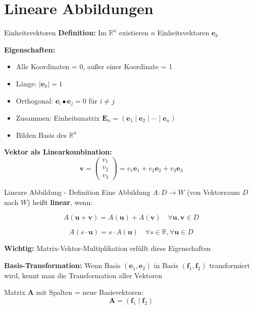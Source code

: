 \documentclass[a4paper, fontsize=7pt]{scrartcl}
\def\R{\mathbb{R}}
\begin{document}
\section{Lineare Abbildungen}

\begin{mainbox}{Einheitsvektoren}
\textbf{Definition:} Im $\R^n$ existieren $n$ Einheitsvektoren $\mathbf{e}_k$

\textbf{Eigenschaften:}
\begin{itemize}
    \item Alle Koordinaten = 0, außer einer Koordinate = 1
    \item Länge: $|\mathbf{e}_k| = 1$
    \item Orthogonal: $\mathbf{e}_i \bullet \mathbf{e}_j = 0$ für $i \neq j$
    \item Zusammen: Einheitsmatrix $\mathbf{E}_n = (\mathbf{e}_1 \mid \mathbf{e}_2 \mid \cdots \mid \mathbf{e}_n)$
    \item Bilden Basis des $\R^n$
\end{itemize}

\textbf{Vektor als Linearkombination:}
$$\mathbf{v} = \begin{pmatrix} v_1 \\ v_2 \\ v_3 \end{pmatrix} = v_1\mathbf{e}_1 + v_2\mathbf{e}_2 + v_3\mathbf{e}_3$$
\end{mainbox}

\begin{mainbox}{Lineare Abbildung - Definition}
Eine Abbildung $A: D \to W$ (von Vektorraum $D$ nach $W$) heißt \textbf{linear}, wenn:

$$A(\mathbf{u} + \mathbf{v}) = A(\mathbf{u}) + A(\mathbf{v}) \quad \forall \mathbf{u}, \mathbf{v} \in D$$

$$A(s \cdot \mathbf{u}) = s \cdot A(\mathbf{u}) \quad \forall s \in \R, \forall \mathbf{u} \in D$$

\textbf{Wichtig:} Matrix-Vektor-Multiplikation erfüllt diese Eigenschaften

\textbf{Basis-Transformation:}
Wenn Basis $(\mathbf{e}_1, \mathbf{e}_2)$ in Basis $(\mathbf{f}_1, \mathbf{f}_2)$ transformiert wird, kennt man die Transformation aller Vektoren

Matrix $\mathbf{A}$ mit Spalten = neue Basisvektoren:
$$\mathbf{A} = (\mathbf{f}_1 \mid \mathbf{f}_2)$$
\end{mainbox}
\end{document}
